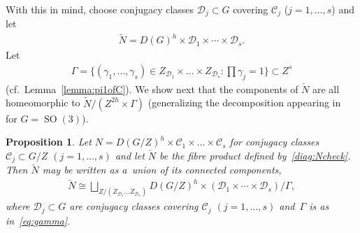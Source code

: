 \documentclass[pdftex]{sigma}
\numberwithin{equation}{section}
\newtheorem{Proposition}[Theorem]{Proposition}
{\theoremstyle{definition}
\newtheorem{Definition}[Theorem]{Definition}
\newtheorem{Example}[Theorem]{Example}
\newtheorem{Remark}[Theorem]{Remark}
}
\DeclareMathOperator{\SO}{SO}
\begin{document}
With this in mind, choose conjugacy classes $\mathcal{D}_j \subset G$ covering $\mathcal{C}_j$ ($j=1,\ldots, s$) and let
\begin{gather*}
\widetilde{N}= D(G)^h\times\mathcal{D}_1 \times \cdots \times \mathcal{D}_s.
\end{gather*}
Let
\begin{gather}
\label{eq:gamma}
\Gamma = \Big\{(\gamma_1, \ldots, \gamma_{s}) \in Z_{\mathcal{D}_1} \times \dots \times Z_{\mathcal{D}_s} \colon \prod
\gamma_j =1 \Big\} \subset Z^s
\end{gather}
(cf.~Lemma~\ref{lemma:pi1ofC}).
We show next that the components of $\check{N}$ are all homeomorphic to $\widetilde{N}/(Z^{2h}\times \Gamma)$
(generalizing the decomposition appearing in~\cite[Lemma~2.3]{KM} for $G=\SO(3)$).

\begin{Proposition}
\label{prop:comps}
Let $N=D(G/Z)^h\times \mathcal{C}_1 \times \dots \times \mathcal{C}_s $ for conjugacy classes $\mathcal{C}_j \subset
G/Z$ $(j=1,\ldots,s)$ and let $\check{N}$ be the fibre product defined by~\eqref{diag:Ncheck}.
Then $\check{N}$ may be written as a~union of its connected components,
\begin{gather*}
\check{N} \cong \bigsqcup_{Z/(Z_{\mathcal{D}_1} \dots Z_{\mathcal{D}_s})}D(G/Z)^h\times (\mathcal{D}_1 \times \cdots
\times \mathcal{D}_s)/{\Gamma},
\end{gather*}
where $\mathcal{D}_j \subset G$ are conjugacy classes covering $\mathcal{C}_j$ $(j=1,\ldots,s)$ and~$\Gamma$ is as
in~\eqref{eq:gamma}.
\end{Proposition}
\end{document}
